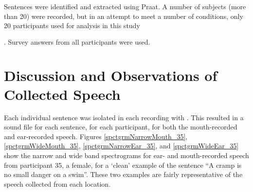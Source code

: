 Sentences were identified and extracted using Praat.  A number of subjects (more than 20) were recorded, but in an attempt to meet a number of conditions, only 20 participants used for analysis in this study \DIFdelbegin {}%

\DIFdelend \DIFaddbegin {}\DIFaddend .  Survey answers from all \DIFaddbegin {}\DIFaddend participants were used.




\section{Discussion and Observations of Collected Speech}\label{chap2:observations}

Each individual sentence was isolated in each recording with \DIFdelbegin {}\DIFdelend \DIFaddbegin {}\DIFaddend .  This resulted in a sound file for each sentence, for each participant, for both the mouth-recorded and ear-recorded speech\DIFaddbegin {}\DIFaddend .  Figures \ref{spctgrmNarrowMouth_35}, \ref{spctgrmWideMouth_35}, \ref{spctgrmNarrowEar_35}, and \ref{spctgrmWideEar_35} show the narrow and wide band spectrograms for ear- and mouth-recorded speech from participant 35, a female, for a `clean' example of the sentence ``A cramp is no small danger on a swim''.  These two examples are fairly representative of the speech collected from each location.

